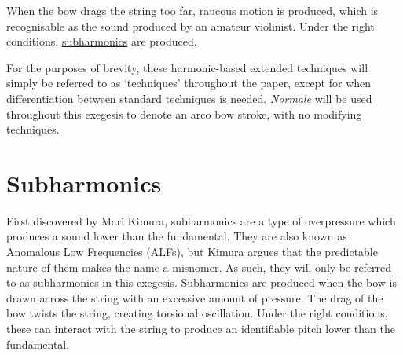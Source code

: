 When the bow drags the string too far, raucous motion is produced, which is recognisable as the sound produced by an amateur violinist.
Under the right conditions, \hyperref[sec:subharmonics]{subharmonics} are produced.

For the purposes of brevity, these harmonic-based extended techniques will simply be referred to as `techniques' throughout the paper, except for when differentiation between standard techniques is needed.
\emph{Normale} will be used throughout this exegesis to denote an arco bow stroke, with no modifying techniques.



\newpage
\section{Subharmonics}\label{sec:subharmonicsDiscussion}
First discovered by Mari Kimura, subharmonics are a type of overpressure which produces a sound lower than the fundamental.\autocite{kimuraHowProduceSubharmonics1999} 
They are also known as Anomalous Low Frequencies (ALFs), but Kimura argues that the predictable nature of them makes the name a misnomer.\autocite[]{kimuraHowProduceSubharmonics1999}
As such, they will only be referred to as subharmonics in this exegesis.
Subharmonics are produced when the bow is drawn across the string with an excessive amount of pressure.
The drag of the bow twists the string, creating torsional oscillation. 
Under the right conditions, these can interact with the string to produce an identifiable pitch lower than the fundamental.\autocite{Subharmonics2006}

